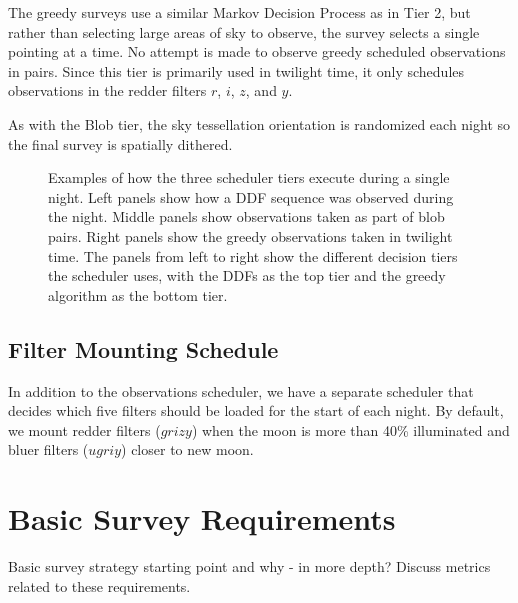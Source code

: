 The greedy surveys use a similar Markov Decision Process as in Tier 2, but rather than selecting large areas of sky to observe, the survey selects a single pointing at a time.  No attempt is made to observe greedy scheduled observations in pairs.  Since this tier is primarily used in twilight time, it only schedules observations in the redder filters $r$, $i$, $z$, and $y$.  

As with the Blob tier, the sky tessellation orientation is randomized each night so the final survey is spatially dithered. 



\begin{figure}

\caption{Examples of how the three scheduler tiers execute during a single night. Left panels show how a DDF sequence was observed during the night. Middle panels show observations taken as part of blob pairs. Right panels show the greedy observations taken in twilight time.  The panels from left to right show the different decision tiers the scheduler uses, with the DDFs as the top tier and the greedy algorithm as the bottom tier. } \label{fig:examplenight}
\end{figure}

\subsection{Filter Mounting Schedule}

In addition to the observations scheduler, we have a separate scheduler that decides which five filters should be loaded for the start of each night.  By default, we mount redder filters ($grizy$) when the moon is more than 40\% illuminated and bluer filters ($ugriy$) closer to new moon. 


\section{Basic Survey Requirements}
Basic survey strategy starting point and why - in more depth? Discuss metrics related to these requirements. 

